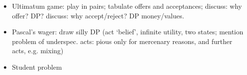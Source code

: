 {  \begin{itemize}

  \item Ultimatum game: play in pairs; tabulate offers and acceptances; discuss: why offer? DP? discuss: why accept/reject? DP money/values.

  \item Pascal's wager: draw silly DP (act `belief', infinite utility, two states; mention problem of underspec. acts: pious only for mercenary reasons, and further acts, e.g. mixing)

  \item Student problem

  \end{itemize}

} %

